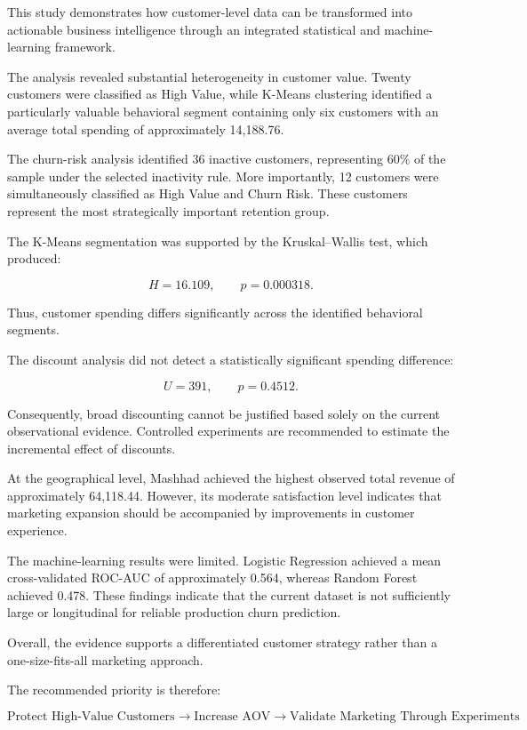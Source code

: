 \documentclass[11pt,a4paper]{article}
\begin{document}
This study demonstrates how customer-level data can be transformed into actionable business intelligence through an integrated statistical and machine-learning framework.

The analysis revealed substantial heterogeneity in customer value. Twenty customers were classified as High Value, while K-Means clustering identified a particularly valuable behavioral segment containing only six customers with an average total spending of approximately 14,188.76.

The churn-risk analysis identified 36 inactive customers, representing 60\% of the sample under the selected inactivity rule. More importantly, 12 customers were simultaneously classified as High Value and Churn Risk. These customers represent the most strategically important retention group.

The K-Means segmentation was supported by the Kruskal--Wallis test, which produced:

\[
H=16.109,\qquad p=0.000318.
\]

Thus, customer spending differs significantly across the identified behavioral segments.

The discount analysis did not detect a statistically significant spending difference:

\[
U=391,\qquad p=0.4512.
\]

Consequently, broad discounting cannot be justified based solely on the current observational evidence. Controlled experiments are recommended to estimate the incremental effect of discounts.

At the geographical level, Mashhad achieved the highest observed total revenue of approximately 64,118.44. However, its moderate satisfaction level indicates that marketing expansion should be accompanied by improvements in customer experience.

The machine-learning results were limited. Logistic Regression achieved a mean cross-validated ROC-AUC of approximately 0.564, whereas Random Forest achieved 0.478. These findings indicate that the current dataset is not sufficiently large or longitudinal for reliable production churn prediction.

Overall, the evidence supports a differentiated customer strategy rather than a one-size-fits-all marketing approach.

The recommended priority is therefore:

\[
\boxed{
\text{Protect High-Value Customers}
\rightarrow
\text{Increase AOV}
\rightarrow
\text{Validate Marketing Through Experiments}
}
\]
\end{document}
